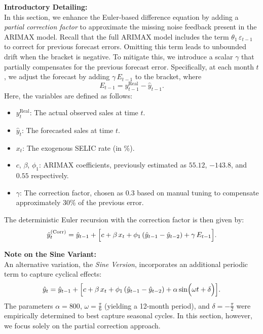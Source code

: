 \documentclass[10pt]{article}
\begin{document}
\textbf{Introductory Detailing:}\\
In this section, we enhance the Euler-based difference equation by adding a \emph{partial correction factor} to approximate the missing noise feedback present in the ARIMAX model. Recall that the full ARIMAX model includes the term \(\theta_1\,\varepsilon_{t-1}\) to correct for previous forecast errors. Omitting this term leads to unbounded drift when the bracket is negative. To mitigate this, we introduce a scalar \(\gamma\) that partially compensates for the previous forecast error. Specifically, at each month \(t\), we adjust the forecast by adding \(\gamma\,E_{t-1}\) to the bracket, where
\[
E_{t-1} = y_{t-1}^{\mathrm{Real}} - \hat{y}_{t-1}.
\]
Here, the variables are defined as follows:
\begin{itemize}
    \item \(y_t^{\mathrm{Real}}\): The actual observed sales at time \(t\).
    \item \(\hat{y}_t\): The forecasted sales at time \(t\).
    \item \(x_t\): The exogenous SELIC rate (in \%).
    \item \(c\), \(\beta\), \(\phi_1\): ARIMAX coefficients, previously estimated as \(55.12\), \(-143.8\), and \(0.55\) respectively.
    \item \(\gamma\): The correction factor, chosen as \(0.3\) based on manual tuning to compensate approximately 30\% of the previous error.
\end{itemize}

The deterministic Euler recursion with the correction factor is then given by:
\[
\hat{y}_t^{(\mathrm{Corr})} = \hat{y}_{t-1} + \Bigl[c + \beta\,x_t + \phi_1\,(\hat{y}_{t-1}-\hat{y}_{t-2}) + \gamma\,E_{t-1}\Bigr].
\]

\textbf{Note on the Sine Variant:}\\
An alternative variation, the \emph{Sine Version}, incorporates an additional periodic term to capture cyclical effects:
\[
\hat{y}_t = \hat{y}_{t-1} + \Bigl[c + \beta\,x_t + \phi_1\,(\hat{y}_{t-1}-\hat{y}_{t-2}) + \alpha\sin\Bigl(\omega t + \delta\Bigr)\Bigr].
\]
The parameters \(\alpha = 800\), \(\omega = \frac{\pi}{6}\) (yielding a 12-month period), and \(\delta = -\frac{\pi}{2}\) were empirically determined to best capture seasonal cycles. In this section, however, we focus solely on the partial correction approach.
\end{document}
